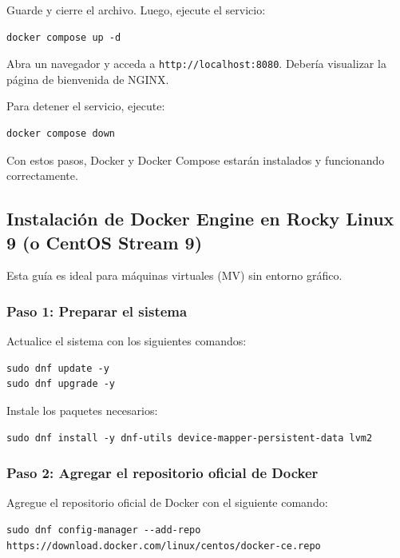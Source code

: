 Guarde y cierre el archivo. Luego, ejecute el servicio:

\begin{lstlisting}[style=customstyle]
docker compose up -d
\end{lstlisting}

Abra un navegador y acceda a \texttt{http://localhost:8080}. Debería visualizar la página de bienvenida de NGINX.

Para detener el servicio, ejecute:

\begin{lstlisting}[style=customstyle]
docker compose down
\end{lstlisting}

Con estos pasos, Docker y Docker Compose estarán instalados y funcionando correctamente.

\subsection{Instalación de Docker Engine en Rocky Linux 9 (o CentOS Stream 9)}

Esta guía es ideal para máquinas virtuales (MV) sin entorno gráfico.

\subsubsection{Paso 1: Preparar el sistema}

Actualice el sistema con los siguientes comandos:

\begin{lstlisting}[style=customstyle]
sudo dnf update -y
sudo dnf upgrade -y
\end{lstlisting}

Instale los paquetes necesarios:

\begin{lstlisting}[style=customstyle]
sudo dnf install -y dnf-utils device-mapper-persistent-data lvm2
\end{lstlisting}

\subsubsection{Paso 2: Agregar el repositorio oficial de Docker}

Agregue el repositorio oficial de Docker con el siguiente comando:

\begin{lstlisting}[style=customstyle]
sudo dnf config-manager --add-repo https://download.docker.com/linux/centos/docker-ce.repo
\end{lstlisting}

